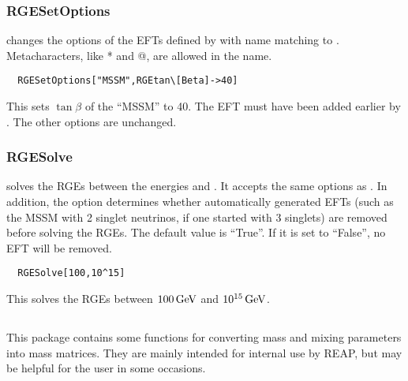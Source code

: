 \documentclass[10pt,a4paper,twoside]{scrartcl}
\begin{document}
\subsubsection{RGESetOptions}

 changes the options
of the EFTs defined by  with name matching  to . Metacharacters, like * and @, are
allowed in the name.

\begin{verbatim}
  RGESetOptions["MSSM",RGEtan\[Beta]->40]
\end{verbatim}
This sets $\tan\beta$ of the ``MSSM'' to 40.  The EFT must have been
added earlier by .  The other options are
unchanged.



\subsubsection{RGESolve}

 solves
the RGEs between the energies  and . 
It accepts the same options as .  In addition, the option
 determines whether automatically
generated EFTs (such as the MSSM with 2 singlet neutrinos, if one
started with 3 singlets) are removed before solving the RGEs. The default
value is ``True''.
If it is set to ``False'', no EFT will be removed.

\begin{verbatim}
  RGESolve[100,10^15]
\end{verbatim}
This solves the RGEs between $100\,\mathrm{GeV}$ and $10^{15}\,\mathrm{GeV}$.







\subsection[\package{RGEInitial}]{}

This package contains some functions for converting mass and mixing parameters
into mass matrices. They are mainly intended for internal use by REAP, but may
be helpful for the user in some occasions.
\end{document}

